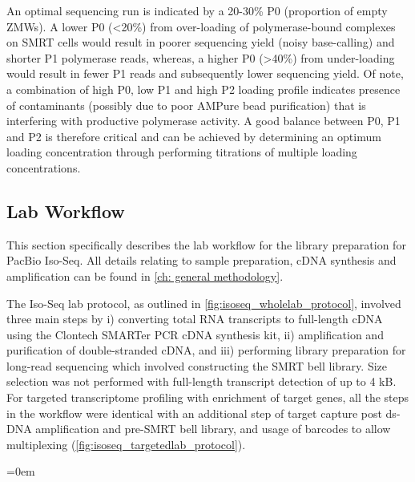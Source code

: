An optimal sequencing run is indicated by a 20-30\% P0 (proportion of empty ZMWs). A lower P0 (<20\%) from over-loading of polymerase-bound complexes on SMRT cells would result in poorer sequencing yield (noisy base-calling) and shorter P1 polymerase reads, whereas, a higher P0 (>40\%) from under-loading would result in fewer P1 reads and subsequently lower sequencing yield. Of note, a combination of high P0, low P1 and high P2 loading profile indicates presence of contaminants (possibly due to poor AMPure bead purification) that is interfering with productive polymerase activity. A good balance between P0, P1 and P2 is therefore critical and can be achieved by determining an optimum loading concentration through performing titrations of multiple loading concentrations.

\subsection{Lab Workflow}
\label{chap:isoseq_labpipeline}
This section specifically describes the lab workflow for the library preparation for PacBio Iso-Seq. All details relating to sample preparation, cDNA synthesis and amplification can be found in \cref{ch: general methodology}.

The Iso-Seq lab protocol, as outlined in \cref{fig:isoseq_wholelab_protocol}, involved three main steps by i) converting total RNA transcripts to full-length cDNA using the Clontech SMARTer PCR cDNA synthesis kit, ii) amplification and purification of double-stranded cDNA, and iii) performing library preparation for long-read sequencing which involved constructing the SMRT bell library. Size selection was not performed with full-length transcript detection of up to 4 kB. For targeted transcriptome profiling with enrichment of target genes, all the steps in the workflow were identical with an additional step of target capture post ds-DNA amplification and pre-SMRT bell library, and usage of barcodes to allow multiplexing (\cref{fig:isoseq_targetedlab_protocol}). 

\begingroup
\parindent=0em
\localtableofcontents 
\endgroup

